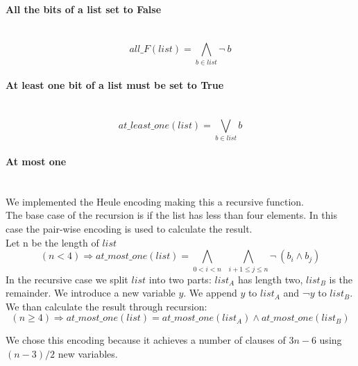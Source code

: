   \paragraph*{All the bits of a list set to False} \hfill \\
    \begin{equation*}
      all\_F(list) = \bigwedge_{b \in list}\neg \ b
    \end{equation*}
  
    \paragraph*{At least one bit of a list must be set to True} \hfill \\
    \begin{equation*}
      at\_least\_one(list) = \bigvee_{b \in list} b
    \end{equation*}

  \paragraph*{At most one} \hfill \\
    We implemented the Heule encoding making this a recursive function.\\
    The base case of the recursion is if the list has less than four elements. In this case the 
    pair-wise encoding is used to calculate the result.\\
    Let n be the length of \(list\) 
    \begin{equation*}
            (n < 4) \Longrightarrow at\_most\_one(list) = \bigwedge_{0 < i < n} \ \ \bigwedge_{i+1 \leq j \leq n}\neg \ (b_i \land b_j)
    \end{equation*}
    In the recursive case we split \(list\)  into two parts: \(list_A\)  has length two, \(list_B\)  is
    the remainder. We introduce a new variable \(y\). We append \(y\)  to \(list_A\)  and ¬\( y\)  to 
    \(list_B\). We than calculate the result through recursion:
    \begin{equation*}
        (n \geq 4) \Longrightarrow at\_most\_one(list) = at\_most\_one(list_A) \land at\_most\_one(list_B)
    \end{equation*}

    We chose this encoding because it achieves a number of clauses of \(3n - 6\)  using \((n-3)/2\) new variables. \\

